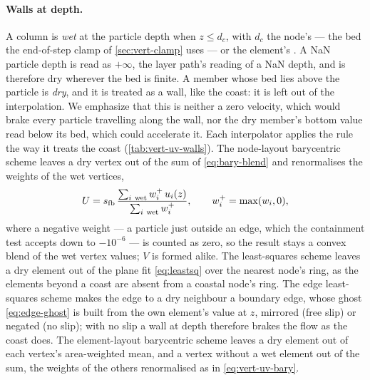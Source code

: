 \paragraph{Walls at depth.} A column is \emph{wet} at the particle depth when $z\le d_c$, with $d_c$ the
node's  --- the bed the end-of-step clamp of \cref{sec:vert-clamp} uses --- or the
element's . A NaN particle depth is read as $+\infty$, the layer path's reading of a NaN
depth, and is therefore dry wherever the bed is finite. A member whose bed lies above the particle is
\emph{dry}, and it is treated as a wall, like the coast: it is left out of the interpolation. We emphasize
that this is neither a zero velocity, which would brake every particle travelling along the wall, nor the
dry member's bottom value read below its bed, which could accelerate it. Each interpolator applies the
rule the way it treats the coast (\cref{tab:vert-uv-walls}). The node-layout barycentric scheme leaves a
dry vertex out of the sum of \cref{eq:bary-blend} and renormalises the weights of the wet vertices,
\begin{equation}\label{eq:vert-uv-bary}
  U = \tdir\,\frac{\sum_{i\ \text{wet}} \bwt{i}^{+}\,u_i(z)}{\sum_{i\ \text{wet}} \bwt{i}^{+}},
  \qquad \bwt{i}^{+}=\max(\bwt{i},0),
\end{equation}
where a negative weight --- a particle just outside an edge, which the containment test accepts down to
$-10^{-6}$ --- is counted as zero, so the result stays a convex blend of the wet vertex values; $V$ is
formed alike. The least-squares scheme leaves a dry element out of the plane fit \cref{eq:leastsq} over
the nearest node's ring, as the elements beyond a coast are absent from a coastal node's ring. The edge
least-squares scheme makes the edge to a dry neighbour a boundary edge, whose ghost \cref{eq:edge-ghost}
is built from the own element's value at $z$, mirrored (free slip) or negated (no slip); with no slip a wall
at depth therefore brakes the flow as the coast does. The element-layout barycentric scheme leaves a dry
element out of each vertex's area-weighted mean, and a vertex without a wet element out of the sum, the
weights of the others renormalised as in \cref{eq:vert-uv-bary}.

